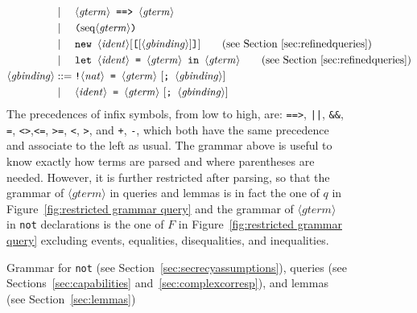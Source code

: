 \documentclass{book}
\newcommand{\nonterm}[1]{\langle\mathit{#1}\rangle}
\newcommand{\seq}[1]{\textrm{seq}\nonterm{#1}}
\begin{document}
\begin{figure}
\begin{align*}
&\mid\phantom{:=}
       \nonterm{gterm} \texttt{ ==> } \nonterm{gterm}\\
&\mid\phantom{:=}
	\texttt{(} \seq{gterm} \texttt{)}\\
&\mid\phantom{:=}
       \texttt{new } \nonterm{ident}[\texttt{[} [\nonterm{gbinding}] \texttt{]}]\tag{see Section~\ref{sec:refinedqueries}}\\
&\mid\phantom{:=}
       \texttt{let } \nonterm{ident}\texttt{ = }\nonterm{gterm} \texttt{ in }\nonterm{gterm} \tag{see Section~\ref{sec:refinedqueries}}\\
%
\nonterm{gbinding} &::=
	\texttt{!}\nonterm{nat}\texttt{ = }\nonterm{gterm}\textrm{ }[\texttt{; }\nonterm{gbinding}]\\
&\mid\phantom{:=}
	\nonterm{ident}\texttt{ = }\nonterm{gterm} \textrm{ }[\texttt{; } \nonterm{gbinding}]
\end{align*}
%
The precedences of infix symbols, from low to high, are:
\texttt{==>}, \texttt{||}, \texttt{\&\&}, \texttt{=}, \texttt{<>},\texttt{<=}, \texttt{>=}, \texttt{<}, \texttt{>}, and \texttt{+}, \texttt{-}, which both have the same precedence and associate to the left as usual.
The grammar above is useful to know exactly how terms are parsed and
where parentheses are needed.
However, it is further restricted after parsing, so that
the grammar of $\nonterm{gterm}$ in queries and lemmas is in fact the one of $q$
in Figure~\ref{fig:restricted grammar query} and the grammar of $\nonterm{gterm}$ in \texttt{not} declarations
is the one of $F$ in Figure~\ref{fig:restricted grammar query} excluding events, equalities, disequalities, and inequalities.
\caption[Grammar for \texttt{not}, queries, and lemmas]{Grammar for \texttt{not} (see Section~\ref{sec:secrecyassumptions}), queries (see Sections~\ref{sec:capabilities} and~\ref{sec:complexcorresp}), and lemmas (see Section~\ref{sec:lemmas})}
\label{fig:grammarNotQueries}
\end{figure}
\end{document}
